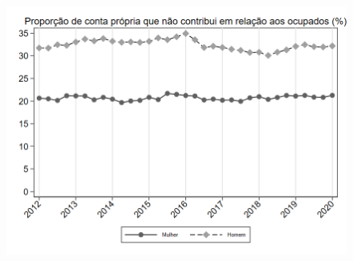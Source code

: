 \begin{frame}[label=_composicao_demografica_genero_prop_cpropriaNc]{}
\textit{\hyperlink{_composicao_demografica_genero}{}}
\begin{figure}
  \centering
  \includegraphics[width=1.0\linewidth]{../../analysis/output/composicao_demografica/genero/_composicao_demografica_genero_prop_cpropriaNc.png}
  \caption{}
  \label{fig:_composicao_demografica_genero_prop_cpropriaNc}
\end{figure}
\end{frame}
